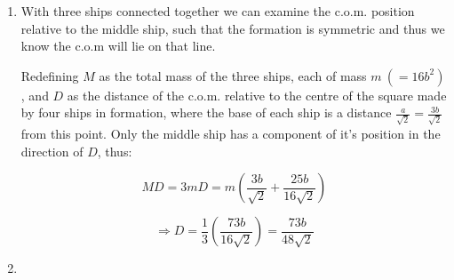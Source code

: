 \begin{problem}
{\begin{enumerate}
	\begin{equation}	x\s{2} = \frac{a}{2\sqrt{2}} +  \frac{b}{2\sqrt{2}} \end{equation}
	
	Can take the density of the bridge and living quarters as 1 without loss of generality. Thus the mass of the bridge $M\s{1} = b^2)$ and the mass of a single living quarter, $M\s{2} = ab$. Remembering that the density of the engine bay is twice that of the rest of the ship, it's mass $M\s{3} = 2(\frac{a^2}{2}) = a^2$.
	
	If we label the distance from the base to the c.o.m. as $D$ and total mass as $M$:
	
	\begin{equation}	M D = (b^2 + 2ab + a^2) D = (a + b)^2 D = b^2 \left( \frac{a}{\sqrt{2}} +  \frac{b}{2\sqrt{2}} \right) +  2ab \left( \frac{a}{2\sqrt{2}} +  \frac{b}{2\sqrt{2}} \right) +  a^2 \left( \frac{a}{3\sqrt{2}} \right)\end{equation}
	
	Substituting in $a = 3b$ and rearranging we find:
	
	\begin{equation} D = \frac{25b}{16\sqrt{2}} \end{equation}
	
	\item
	
	With three ships connected together we can examine the c.o.m. position relative to the middle ship, such that the formation is symmetric and thus we know the c.o.m will lie on that line.
	
	Redefining $M$ as the total mass of the three ships, each of mass $m~ (= 16 b^2)$, and $D$ as the distance of the c.o.m. relative to the centre of the square made by four ships in formation, where the base of each ship is a distance $\frac{a}{\sqrt2} = \frac{3b}{\sqrt2}$ from this point. Only the middle ship has a component of it's position in the direction of $D$, thus:
	
	\begin{equation} M D = 3 m D = m \left(  \frac{3b}{\sqrt2} +  \frac{25b}{16\sqrt{2}} \right) \end{equation}
	
	\begin{equation}\Rightarrow D = \frac{1}{3} \left( \frac{73 b}{16\sqrt{2}} \right) = \frac{73b}{48\sqrt{2}} \end{equation}
	
	\item
	

\end{enumerate}}
\end{problem}
